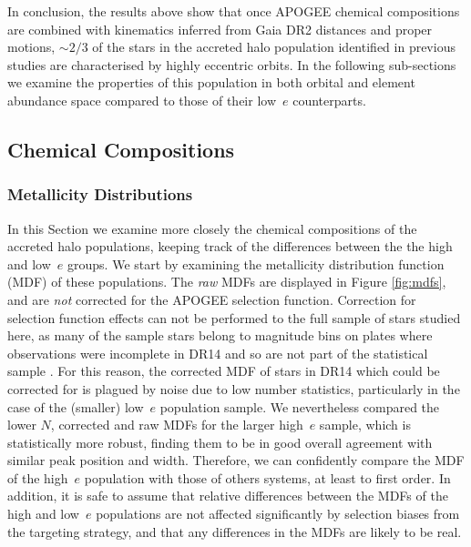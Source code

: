 In conclusion, the results above show that once APOGEE chemical
compositions are combined with kinematics inferred from Gaia DR2
distances and proper motions, $\sim 2/3$ of the stars in the accreted
halo population identified in previous studies are characterised
by highly eccentric orbits.  In the following sub-sections we examine
the properties of this population in both orbital and element
abundance space compared to those of their low~$e$ counterparts.



\subsection{Chemical Compositions}

\subsubsection{Metallicity Distributions} \label{sec:mdfs}

In this Section we examine more closely the chemical compositions
of the accreted halo populations, keeping track of the differences
between the the high and low~$e$ groups.  We start by examining the
metallicity distribution function (MDF) of these populations.  The
{\it raw} MDFs are displayed in Figure \ref{fig:mdfs}, and are {\it
not} corrected for the APOGEE selection function. Correction for
selection function effects can not be performed to the full sample of stars studied here,
as many of the sample stars belong to magnitude bins on plates where observations were
incomplete in DR14 and so are not part of the statistical sample
\citep[see][for details on the selection function of APOGEE and the
targeting strategy, respectively]{2014ApJ...790..127B,2013AJ....146...81Z}.
For this reason, the corrected MDF of stars in DR14 which could be corrected for is plagued by noise due
to low number statistics, particularly in the case of the (smaller)
low~$e$ population sample.  We nevertheless compared the lower $N$, corrected
and raw MDFs for the larger high~$e$ sample, which is statistically
more robust, finding them to be in good overall agreement with
similar peak position and width.  Therefore, we can confidently
compare the MDF of the high~$e$ population with those of others
systems, at least to first order.  In addition, it is safe to assume
that relative differences between the MDFs of the high and low~$e$
populations are not affected significantly by selection biases from
the targeting strategy, and that any differences in the MDFs are
likely to be real.

